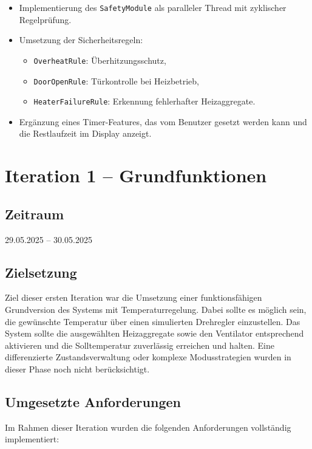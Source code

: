 \documentclass[a4paper,12pt]{article}
\begin{document}
\begin{itemize}
    \item Implementierung des \texttt{SafetyModule} als paralleler Thread mit zyklischer Regelprüfung.
    \item Umsetzung der Sicherheitsregeln:
    \begin{itemize}
        \item \texttt{OverheatRule}: Überhitzungsschutz,
        \item \texttt{DoorOpenRule}: Türkontrolle bei Heizbetrieb,
        \item \texttt{HeaterFailureRule}: Erkennung fehlerhafter Heizaggregate.
    \end{itemize}
    \item Ergänzung eines Timer-Features, das vom Benutzer gesetzt werden kann und die Restlaufzeit im Display anzeigt.
\end{itemize}

\newpage

\section{Iteration 1 – Grundfunktionen}
\label{sec:iteration1}

\subsection{Zeitraum}
29.05.2025 – 30.05.2025

\subsection{Zielsetzung}

Ziel dieser ersten Iteration war die Umsetzung einer funktionsfähigen Grundversion des Systems mit Temperaturregelung. Dabei sollte es möglich sein, die gewünschte Temperatur über einen simulierten Drehregler einzustellen. Das System sollte die ausgewählten Heizaggregate sowie den Ventilator entsprechend aktivieren und die Solltemperatur zuverlässig erreichen und halten. Eine differenzierte Zustandsverwaltung oder komplexe Modusstrategien wurden in dieser Phase noch nicht berücksichtigt.

\subsection{Umgesetzte Anforderungen}

Im Rahmen dieser Iteration wurden die folgenden Anforderungen vollständig implementiert:
\end{document}
